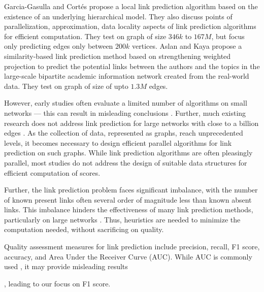 Garcia-Gasulla and Cort{\'e}s \cite{garcia2014link} propose a local link prediction algorithm based on the existence of an underlying hierarchical model. They also discuss points of parallelization, approximation, data locality aspects of link prediction algorithms for efficient computation. They test on graph of size $346k$ to $167M$, but focus only predicting edges only between $200k$ vertices.
Aslan and Kaya \cite{aslan2018topic} propose a similarity-based link prediction method based on strengthening weighted projection to predict the potential links between the authors and the topics in the large-scale bipartite academic information network created from the real-world data. They test on graph of size of upto $1.3M$ edges.









However, early studies often evaluate a limited number of algorithms on small networks --- this can result in misleading conclusions \cite{zhou2021progresses, zhou2021experimental}. Further, much existing research does not address link prediction for large networks with close to a billion edges \cite{muscoloni2022adaptive, mumin2022efficient, nasiri2021novel, xian2021towards, ghasemian2020stacking, mara2020benchmarking, wang2019link, xu2019distributed, mohan2017scalable, cui2016bounded, garcia2014link, papadimitriou2012fast}. As the collection of data, represented as graphs, reach unprecedented levels, it becomes necessary to design efficient parallel algorithms for link prediction on such graphs. While link prediction algorithms are often pleasingly parallel, most studies do not address the design of suitable data structures for efficient computation of scores.

Further, the link prediction problem faces significant imbalance, with the number of known present links often several order of magnitude less than known absent links. This imbalance hinders the effectiveness of many link prediction methods, particularly on large networks \cite{wang2014link, garcia2014link}. Thus, heuristics are needed to minimize the computation needed, without sacrificing on quality. Quality assessment measures for link prediction include precision, recall, F1 score, accuracy, and Area Under the Receiver Curve (AUC). While AUC is commonly used \cite{arrar2023comprehensive}, it may provide misleading results \cite{yang2015evaluating, lichtnwalter2012link}, leading to our focus on F1 score.

